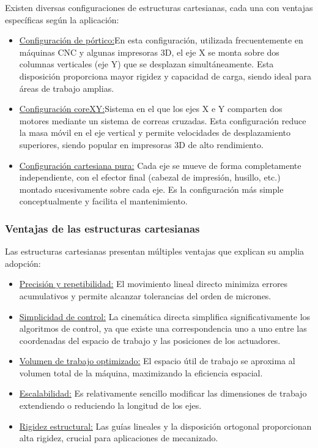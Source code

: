 Existen diversas configuraciones de estructuras cartesianas, cada una con ventajas específicas según la aplicación:
\begin{itemize}[label=$\bullet$]
    \item \underline{Configuración de pórtico:}En esta configuración, utilizada frecuentemente en máquinas CNC y algunas impresoras 3D, el eje X se monta sobre dos columnas verticales (eje Y) que se desplazan simultáneamente. Esta disposición proporciona mayor rigidez y capacidad de carga, siendo ideal para áreas de trabajo amplias.
    \item \underline{Configuración coreXY:}Sistema en el que los ejes X e Y comparten dos motores mediante un sistema de correas cruzadas. Esta configuración reduce la masa móvil en el eje vertical y permite velocidades de desplazamiento superiores, siendo popular en impresoras 3D de alto rendimiento.
    \item \underline{Configuración cartesiana pura:} Cada eje se mueve de forma completamente independiente, con el efector final (cabezal de impresión, husillo, etc.) montado sucesivamente sobre cada eje. Es la configuración más simple conceptualmente y facilita el mantenimiento.
\end{itemize}

\subsubsection{Ventajas de las estructuras cartesianas}

Las estructuras cartesianas presentan múltiples ventajas que explican su amplia adopción:

\begin{itemize}[label=$\bullet$]
    \item \underline{Precisión y repetibilidad:} El movimiento lineal directo minimiza errores acumulativos y permite alcanzar tolerancias del orden de micrones.

    \item \underline{Simplicidad de control:} La cinemática directa simplifica significativamente los algoritmos de control, ya que existe una correspondencia uno a uno entre las coordenadas del espacio de trabajo y las posiciones de los actuadores.

    \item \underline{Volumen de trabajo optimizado:} El espacio útil de trabajo se aproxima al volumen total de la máquina, maximizando la eficiencia espacial.

    \item \underline{Escalabilidad:} Es relativamente sencillo modificar las dimensiones de trabajo extendiendo o reduciendo la longitud de los ejes.

    \item \underline{Rigidez estructural:} Las guías lineales y la disposición ortogonal proporcionan alta rigidez, crucial para aplicaciones de mecanizado.
\end{itemize}

